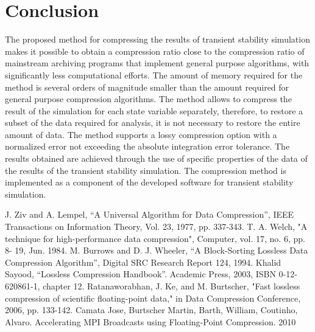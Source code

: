 \documentclass[lettersize,journal]{IEEEtran}
\begin{document}
\section{Conclusion}
The proposed method for compressing the results of transient stability simulation makes it possible to obtain a compression ratio 
close to the compression ratio of mainstream archiving programs that implement general purpose algorithms, with significantly 
less computational efforts. The amount of memory required for the method is several orders of magnitude smaller than the amount 
required for general purpose compression algorithms. The method allows to compress the result of the simulation for each 
state variable separately, therefore, to restore a subset of the data required for analysis, it is not necessary to restore 
the entire amount of data. The method supports a lossy compression option with a normalized error not exceeding the absolute 
integration error tolerance. The results obtained are achieved through the use of specific properties of the data of the results of the 
transient stability simulation. The compression method is implemented as a component of the developed software for 
transient stability simulation.

\begin{thebibliography}{1}


J. Ziv and A. Lempel, “A Universal Algorithm for Data Compression”, IEEE Transactions on
Information Theory, Vol. 23, 1977, pp. 337-343.
T. A. Welch, "A technique for high-performance data compression", Computer, vol. 17, no. 6, pp. 8-
19, Jun. 1984.
M. Burrows and D. J. Wheeler, “A Block-Sorting Lossless Data Compression Algorithm”, Digital
SRC Research Report 124, 1994.
Khalid Sayood, “Lossless Compression Handbook”. Academic Press, 2003, ISBN 0-12-620861-1,
chapter 12.
Ratanaworabhan, J. Ke, and M. Burtscher, "Fast lossless compression of scientific floating-point data,"
in Data Compression Conference, 2006, pp. 133-142.
Camata Jose, Burtscher Martin, Barth, William, Coutinho, Alvaro. Accelerating MPI Broadcasts using Floating-Point Compression. 2010

\end{thebibliography}
\newpage
\end{document}
